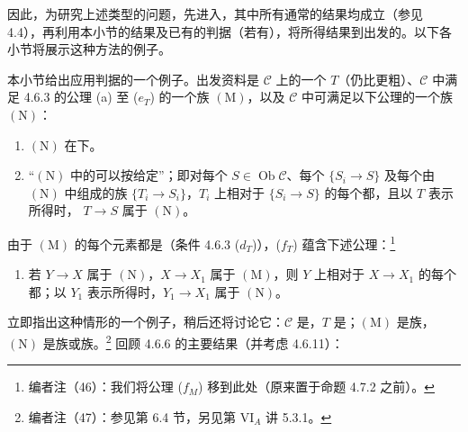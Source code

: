 因此，为研究上述类型的问题，先进入，其中所有通常的结果均成立（参见 4.4），再利用本小节的结果及已有的判据（若有），将所得结果到出发的。以下各小节将展示这种方法的例子。

本小节给出应用判据的一个例子。出发资料是 $\mathcal C$ 上的一个 $T$（仍比更粗）、$\mathcal C$ 中满足 4.6.3 的公理 (a) 至 ($e_T$) 的一个族 $(\mathrm M)$，以及 $\mathcal C$ 中可满足以下公理的一个族 $(\mathrm N)$：
\begin{enumerate}
\item[(a)] $(\mathrm N)$ 在下。
\item[($f_T$)] “$(\mathrm N)$ 中的可以按给定”；即对每个 $S\in\operatorname{Ob}\mathcal C$、每个 $\{S_i\to S\}$ 及每个由 $(\mathrm N)$ 中组成的族 $\{T_i\to S_i\}$，$T_i$ 上相对于 $\{S_i\to S\}$ 的每个都，且以 $T$ 表示所得时， $T\to S$ 属于 $(\mathrm N)$。
\end{enumerate}
由于 $(\mathrm M)$ 的每个元素都是（条件 4.6.3 ($d_T$)），($f_T$) 蕴含下述公理：\footnote{编者注（46）：我们将公理 ($f_M$) 移到此处（原来置于命题 4.7.2 之前）。}
\begin{enumerate}
\item[($f_M$)] 若 $Y\to X$ 属于 $(\mathrm N)$，$X\to X_1$ 属于 $(\mathrm M)$，则 $Y$ 上相对于 $X\to X_1$ 的每个都；以 $Y_1$ 表示所得时，$Y_1\to X_1$ 属于 $(\mathrm N)$。
\end{enumerate}
立即指出这种情形的一个例子，稍后还将讨论它：$\mathcal C$ 是，$T$ 是；$(\mathrm M)$ 是族，$(\mathrm N)$ 是族或族。\footnote{编者注（47）：参见第 6.4 节，另见第 VI$_A$ 讲 5.3.1。}
回顾 4.6.6 的主要结果（并考虑 4.6.11）：
